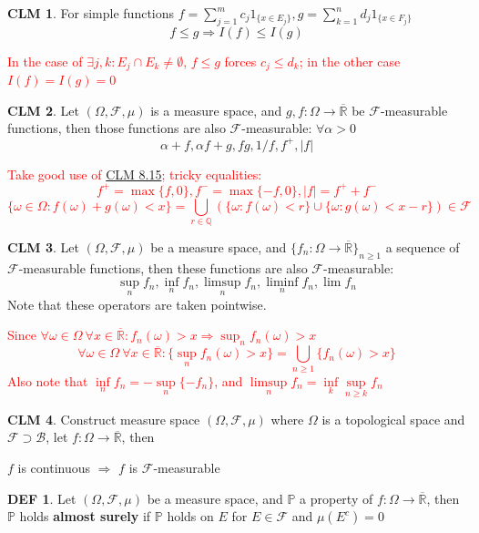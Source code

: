 \documentclass[hidelinks]{article}
\theoremstyle{definition}
\newtheorem*{defin}{DEF}
\theoremstyle{dotless}
\newtheorem{claim}{CLM}[section]
\theoremstyle{remark}
\begin{document}
\begin{claim}\label{CLM 8.16}
For simple functions $f=\sum\limits_{j=1}^mc_j1_{\{x\in E_j\}},g=\sum\limits_{k=1}^nd_j1_{\{x\in F_j\}}$
\[f\leq g\Rightarrow I(f)\leq I(g)\]
\end{claim}
\textcolor{red}{In the case of $\exists j,k:E_j\cap E_k\neq\emptyset$, $f\leq g$ forces $c_j\leq d_k$; in the other case $I(f)=I(g)=0$}

\begin{claim}
Let $(\Omega,\mathscr{F},\mu)$ is a measure space, and $g,f:\Omega\to\overline{\mathbb{R}}$ be $\mathscr{F}$-measurable functions, then those functions are also $\mathscr{F}$-measurable: $\forall\alpha>0$
\[\alpha+f,\alpha f+g,fg,1/f,f^+,|f|\]
\end{claim}
\textcolor{red}{Take good use of \hyperref[CLM 8.15]{CLM 8.15}; tricky equalities:
\[f^+=\max\{f,0\},f^-=\max\{-f,0\},|f|=f^++f^-\]
\[\{\omega\in\Omega:f(\omega)+g(\omega)<x\}=\bigcup_{r\in\mathbb{Q}}(\{\omega:f(\omega)<r\}\cup\{\omega:g(\omega)<x-r\})\in\mathscr{F}\]}

\begin{claim}
Let $(\Omega,\mathscr{F},\mu)$ be a measure space, and $\{f_n:\Omega\to\overline{\mathbb{R}}\}_{n\geq1}$ a sequence of $\mathscr{F}$-measurable functions, then these functions are also $\mathscr{F}$-measurable:
\[\sup_nf_n,\inf_nf_n,\limsup_nf_n,\liminf_nf_n,\lim f_n\]
Note that these operators are taken pointwise.
\end{claim}
\textcolor{red}{Since $\forall\omega\in\Omega\ \forall x\in\overline{\mathbb{R}}:f_n(\omega)>x\Rightarrow\sup_nf_n(\omega)>x$
\[\forall\omega\in\Omega\ \forall x\in\overline{\mathbb{R}}:\{\sup_nf_n(\omega)>x\}=\bigcup_{n\geq1}\{f_n(\omega)>x\}\]
Also note that $\inf\limits_nf_n=-\sup\limits_n\{-f_n\}$, and $\limsup\limits_nf_n=\inf\limits_k\sup\limits_{n\geq k}f_n$}

\begin{claim}
Construct measure space $(\Omega,\mathscr{F},\mu)$ where $\Omega$ is a topological space and $\mathscr{F}\supset\mathscr{B}$, let $f:\Omega\to\overline{\mathbb{R}}$, then
\begin{center}$f$ is continuous $\Rightarrow$ $f$ is $\mathscr{F}$-measurable\end{center}
\end{claim}

\begin{defin}
Let $(\Omega,\mathscr{F},\mu)$ be a measure space, and $\mathbb{P}$ a property of $f:\Omega\to\overline{\mathbb{R}}$, then $\mathbb{P}$ holds \textbf{almost surely} if $\mathbb{P}$ holds on $E$ for $E\in\mathscr{F}$ and $\mu(E^c)=0$
\end{defin}
\end{document}
